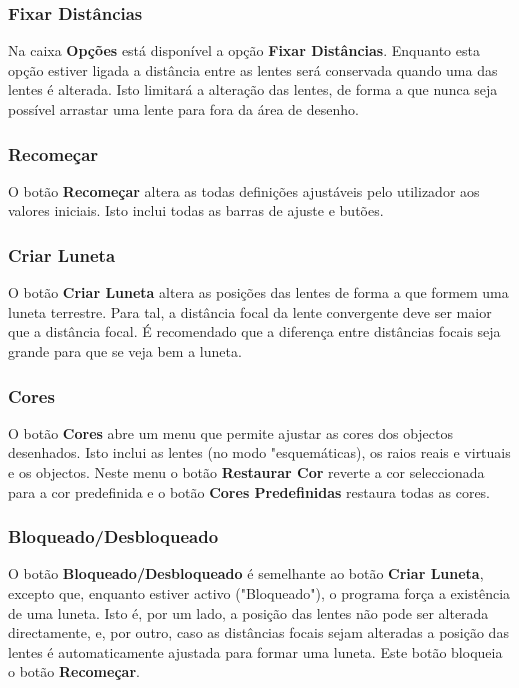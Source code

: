 \documentclass{scrartcl}
\begin{document}
\subsubsection{Fixar Distâncias}

Na caixa {\bf Opções} está disponível a opção {\bf Fixar Distâncias}. Enquanto esta opção estiver ligada a distância entre as lentes será conservada quando uma das lentes é alterada. Isto limitará a alteração das lentes, de forma a que nunca seja possível arrastar uma lente para fora da área de desenho.
\par

\subsubsection{Recomeçar}

O botão {\bf Recomeçar} altera as todas definições ajustáveis pelo utilizador aos valores iniciais. Isto inclui todas as barras de ajuste e butões.
\par

\subsubsection{Criar Luneta}

O botão {\bf Criar Luneta} altera as posições das lentes de forma a que formem uma luneta terrestre. Para tal, a distância focal da lente convergente deve ser maior que a distância focal. É recomendado que a diferença entre distâncias focais seja grande para que se veja bem a luneta.
\par

\subsubsection{Cores}

O botão {\bf Cores} abre um menu que permite ajustar as cores dos objectos desenhados. Isto  inclui as lentes (no modo "esquemáticas), os raios reais e virtuais e os objectos. Neste menu o botão {\bf Restaurar Cor} reverte a cor seleccionada para a cor predefinida e o botão {\bf Cores Predefinidas} restaura todas as cores.
\par

\subsubsection{Bloqueado/Desbloqueado}

O botão {\bf Bloqueado/Desbloqueado} é semelhante ao botão {\bf Criar Luneta}, excepto que, enquanto estiver activo ("Bloqueado"), o programa força a existência de uma luneta. Isto é, por um lado, a posição das lentes não pode ser alterada directamente, e, por outro, caso as distâncias focais sejam alteradas a posição das lentes é automaticamente ajustada para formar uma luneta. Este botão bloqueia o botão {\bf Recomeçar}.
\end{document}
